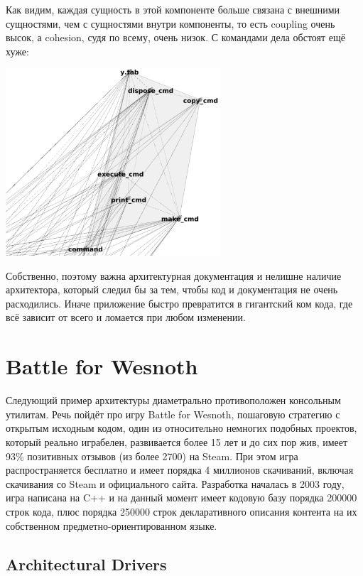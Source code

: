 \documentclass{../../text-style}
\begin{document}
Как видим, каждая сущность в этой компоненте больше связана с внешними сущностями, чем с сущностями внутри компоненты, то есть coupling очень высок, а cohesion, судя по всему, очень низок. С командами дела обстоят ещё хуже:

\begin{center}
    \includegraphics[width=0.6\textwidth]{bashCommands.png}
\end{center}

Собственно, поэтому важна архитектурная документация и нелишне наличие архитектора, который следил бы за тем, чтобы код и документация не очень расходились. Иначе приложение быстро превратится в гигантский ком кода, где всё зависит от всего и ломается при любом изменении.

\section{Battle for Wesnoth}

Следующий пример архитектуры диаметрально противоположен консольным утилитам. Речь пойдёт про игру Battle for Wesnoth, пошаговую стратегию с открытым исходным кодом, один из относительно немногих подобных проектов, который реально играбелен, развивается более 15 лет и до сих пор жив, имеет 93\% позитивных отзывов (из более 2700) на Steam. При этом игра распространяется бесплатно и имеет порядка 4 миллионов скачиваний, включая скачивания со Steam и официального сайта. Разработка началась в 2003 году, игра написана на C++ и на данный момент имеет кодовую базу порядка 200000 строк кода, плюс порядка 250000 строк декларативного описания контента на их собственном предметно-ориентированном языке.

\subsection{Architectural Drivers}
\end{document}
